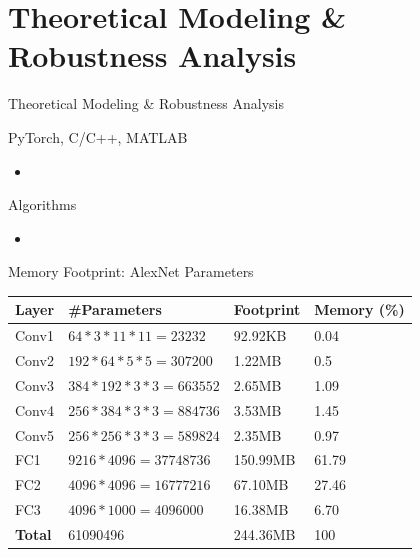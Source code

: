 \setlength{\parskip}{\baselineskip}
\section[Theoretical Modeling]{Theoretical Modeling \& Robustness Analysis}

\begin{frame}
	\huge Theoretical Modeling \& Robustness Analysis
\end{frame}

\begin{frame}{PyTorch, C/C++, MATLAB}
	\begin{itemize}
		\item
	\end{itemize}
\end{frame}

\begin{frame}{Algorithms}
	\begin{itemize}
		\item
	\end{itemize}
\end{frame}

\begin{frame}{Memory Footprint: AlexNet Parameters}
	\begin{table}[H]
		\centering
		\begin{tabular}{llll}
			\toprule
			\textbf{Layer} & \textbf{\#Parameters}        & \textbf{Footprint} & \textbf{Memory (\%)} \\
			\midrule
			Conv1          & $64 * 3 * 11 * 11 = 23232$   & 92.92KB            & 0.04                 \\
			Conv2          & $192 * 64 * 5 * 5 = 307200$  & 1.22MB             & 0.5                  \\
			Conv3          & $384 * 192 * 3 * 3 = 663552$ & 2.65MB             & 1.09                 \\
			Conv4          & $256 * 384 * 3 * 3 = 884736$ & 3.53MB             & 1.45                 \\
			Conv5          & $256 * 256 * 3 * 3 = 589824$ & 2.35MB             & 0.97                 \\
			FC1            & $9216 * 4096 = 37748736$     & 150.99MB           & 61.79                \\
			FC2            & $4096 * 4096 = 16777216$     & 67.10MB            & 27.46                \\
			FC3            & $4096 * 1000 = 4096000$      & 16.38MB            & 6.70                 \\
			\midrule
			\textbf{Total} & 61090496                     & 244.36MB           & 100                  \\
			\bottomrule
		\end{tabular}
	\end{table}
\end{frame}

